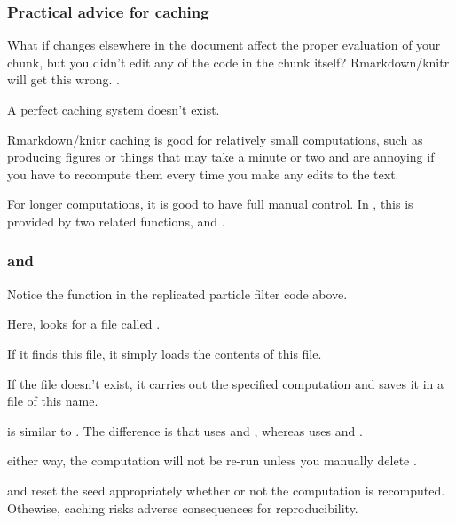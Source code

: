 \begin{frame}[fragile]
\frametitle{Practical advice for caching}
\bi
\item  What if changes elsewhere in the document affect the proper evaluation of your chunk, but you didn't edit any of the code in the chunk itself?
Rmarkdown/knitr will get this wrong. .

\item  A perfect caching system doesn't exist. 

\item  Rmarkdown/knitr caching is good for relatively small computations, such as producing figures or things that may take a minute or two and are annoying if you have to recompute them every time you make any edits to the text.

\item  For longer computations, it is good to have full manual control. In , this is provided by two related functions,  and .

\ei

\end{frame}

\begin{frame}[fragile]

\frametitle{ and }
\bi
\item  Notice the function  in the replicated particle filter code above.

\item  Here,  looks for a file called . 

\item  If it finds this file, it simply loads the contents of this file.

\item  If the file doesn't exist, it carries out the specified computation and saves it in a file of this name.

\item  {} is similar to . The difference is that  uses  and , whereas  uses  and . 

\item  either way, the computation will not be re-run unless you manually delete .

\item  {} and  reset the seed appropriately whether or not the computation is recomputed. Othewise, caching risks adverse consequences for reproducibility.

\ei

\end{frame}   

